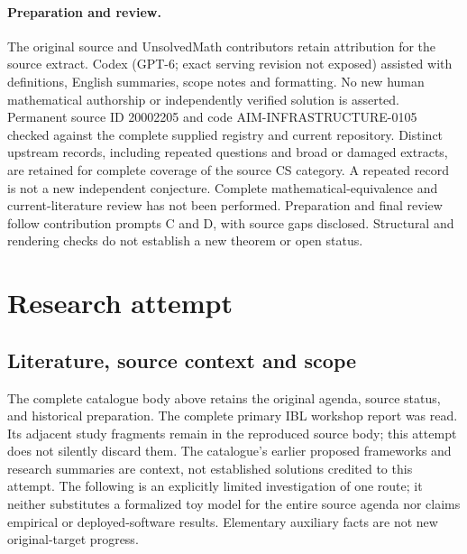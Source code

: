 \documentclass[11pt]{article}
\begin{document}
\paragraph{Preparation and review.}
The original source and UnsolvedMath contributors retain attribution for the source extract. Codex (GPT-6; exact serving revision not exposed) assisted with definitions, English summaries, scope notes and formatting. No new human mathematical authorship or independently verified solution is asserted. Permanent source ID 20002205 and code AIM-INFRASTRUCTURE-0105 checked against the complete supplied registry and current repository. Distinct upstream records, including repeated questions and broad or damaged extracts, are retained for complete coverage of the source CS category. A repeated record is not a new independent conjecture. Complete mathematical-equivalence and current-literature review has not been performed. Preparation and final review follow contribution prompts C and D, with source gaps disclosed. Structural and rendering checks do not establish a new theorem or open status.
\label{end:20002205}

\section{Research attempt}
\subsection{Literature, source context and scope}
The complete catalogue body above retains the original agenda, source status, and historical preparation. The complete primary IBL workshop report was read. Its adjacent study fragments remain in the reproduced source body; this attempt does not silently discard them. The catalogue's earlier proposed frameworks and research summaries are context, not established solutions credited to this attempt. The following is an explicitly limited investigation of one route; it neither substitutes a formalized toy model for the entire source agenda nor claims empirical or deployed-software results. Elementary auxiliary facts are not new original-target progress.
\end{document}
